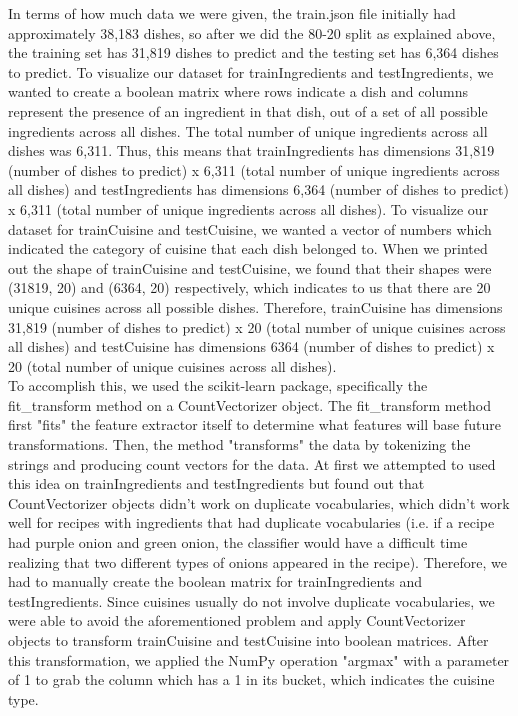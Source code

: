 \documentclass[11pt]{article}
\begin{document}
In terms of how much data we were given, the train.json file initially had approximately
38,183 dishes, so after we did the 80-20 split as explained above, the training set
has 31,819 dishes to predict and the testing set has 6,364 dishes to predict. To
visualize our dataset for trainIngredients and testIngredients, we wanted to create a boolean matrix where rows indicate
a dish and columns represent the presence of an ingredient in that dish, out of
a set of all possible ingredients across all dishes. The total number of unique
ingredients across all dishes was 6,311. Thus, this means that
trainIngredients has dimensions 31,819 (number of dishes to predict) x 6,311 (total
number of unique ingredients across all dishes) and testIngredients has dimensions
6,364 (number of dishes to predict) x 6,311 (total
number of unique ingredients across all dishes). To visualize our dataset
for trainCuisine and testCuisine, we wanted a vector of numbers which indicated
the category of cuisine that each dish belonged to. When we printed out the shape
of trainCuisine and testCuisine, we found that their shapes were (31819, 20)
and (6364, 20) respectively, which indicates to us that there are 20 unique cuisines
across all possible dishes. Therefore, trainCuisine has dimensions 31,819
(number of dishes to predict) x 20 (total number of unique cuisines across all dishes)
and testCuisine has dimensions 6364
(number of dishes to predict) x 20 (total number of unique cuisines across all dishes). \\

To accomplish this, we used the scikit-learn package, specifically the fit\_transform
method on a CountVectorizer object. The fit\_transform method first "fits" the
feature extractor itself to determine what features will base future transformations.
Then, the method "transforms" the data by tokenizing the strings and producing
count vectors for the data. At first
we attempted to used this idea on trainIngredients and testIngredients but found
out that CountVectorizer objects didn't work on duplicate vocabularies, which
didn't work well for recipes with ingredients that had duplicate vocabularies (i.e. if a
recipe had purple onion and green onion, the classifier would have a difficult time
realizing that two different types of onions appeared in the recipe). Therefore,
we had to manually create the boolean matrix for trainIngredients and testIngredients.
Since cuisines usually do not involve duplicate vocabularies, we were able
to avoid the aforementioned problem and apply CountVectorizer objects to transform
trainCuisine and testCuisine into boolean matrices. After this transformation, we
applied the NumPy operation "argmax" with a parameter of 1 to grab the column
which has a 1 in its bucket, which indicates the cuisine type. \\
\end{document}
